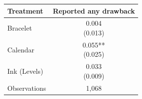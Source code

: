 


\centering
\begin{tabular}[t]{lc}
\toprule
Treatment & Reported any drawback\\
\midrule
Bracelet & \makecell[c]{0.004\\(0.013)}\\
Calendar & \makecell[c]{0.055**\\(0.025)}\\
\midrule
Ink (Levels) & \makecell[c]{0.033\\(0.009)}\\
Observations & 1,068\\
\bottomrule
\end{tabular}

